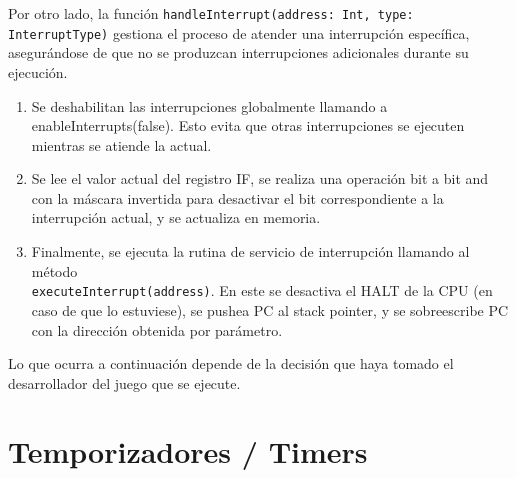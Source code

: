 Por otro lado, la función \texttt{handleInterrupt(address: Int, type: InterruptType)} gestiona el proceso de atender una interrupción específica, asegurándose de que no se produzcan interrupciones adicionales durante su ejecución.

\begin{enumerate}
    \item Se deshabilitan las interrupciones globalmente llamando a enableInterrupts(false). Esto evita que otras interrupciones se ejecuten mientras se atiende la actual.
    \item Se lee el valor actual del registro IF, se realiza una operación bit a bit and con la máscara invertida para desactivar el bit correspondiente a la interrupción actual, y se actualiza en memoria.
    \item Finalmente, se ejecuta la rutina de servicio de interrupción llamando al método \\
    \texttt{executeInterrupt(address)}. En este se desactiva el HALT de la CPU (en caso de que lo estuviese), se pushea PC al stack pointer, y se sobreescribe PC con la dirección obtenida por parámetro. 
\end{enumerate}

Lo que ocurra a continuación depende de la decisión que haya tomado el desarrollador del juego que se ejecute.

\section{Temporizadores / Timers}

\cleardoublepage
